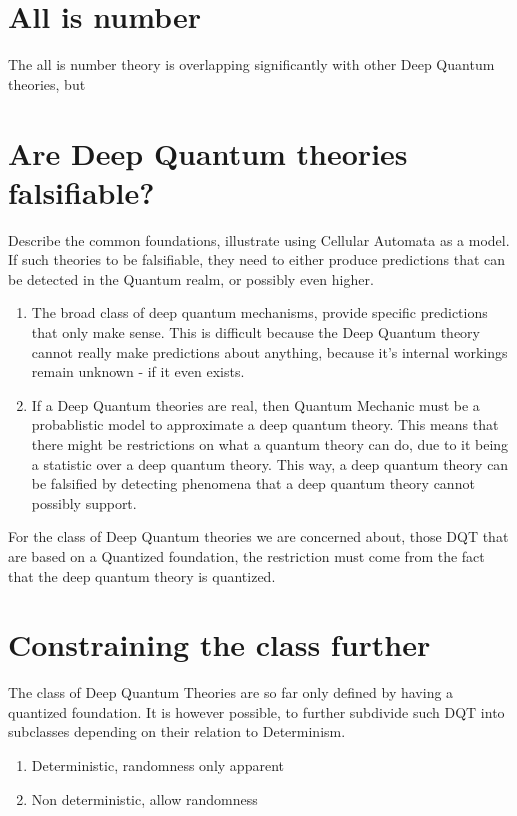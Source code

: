 \documentclass[notitlepage]{report}
\begin{document}
\section*{All is number}
The all is number theory is overlapping significantly with other Deep Quantum theories, but 

\section*{Are Deep Quantum theories falsifiable?}
Describe the common foundations, illustrate using Cellular Automata as a model. If such theories to be falsifiable, they need to either produce predictions that can be detected in the Quantum realm, or possibly even higher. 

\begin{enumerate}
	\item  The broad class of deep quantum mechanisms, provide specific predictions that only make sense. This is difficult because the Deep Quantum theory cannot really make predictions about anything, because it's internal workings remain unknown - if it even exists.
	\item  If a Deep Quantum theories are real, then Quantum Mechanic must be a probablistic model to approximate a deep quantum theory. This means that there might be restrictions on what a quantum theory can do,  due to it being a statistic over a deep quantum theory. This way, a deep quantum theory can be falsified by detecting phenomena that a deep quantum theory cannot possibly support.
	
\end{enumerate}
For the class of Deep Quantum theories we are concerned about, those DQT that are based on a Quantized foundation, the restriction must come from the fact that the deep quantum theory is quantized. 
	
\section*{Constraining the class further }
The class of Deep Quantum Theories are so far only defined by having a quantized foundation. It is however possible, to further subdivide such DQT into subclasses depending on their relation to Determinism. 

\begin{enumerate}
\item Deterministic, randomness only apparent
\item Non deterministic, allow randomness
\end{enumerate}
\end{document}
